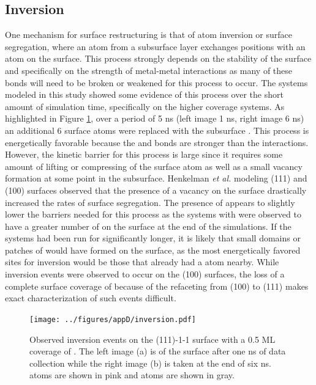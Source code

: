 \subsection{Inversion}
One mechanism for surface restructuring is that of atom inversion or surface
segregation, where an atom from a subsurface layer exchanges positions with an
atom on the surface.  This process strongly depends on the stability of the
surface and specifically on  the strength of metal-metal interactions as many
of these bonds will need to be broken or weakened for this process to occur.
The  systems modeled in this study showed some evidence of this
process over the short amount of simulation time, specifically on the higher
 coverage systems. As highlighted in Figure \ref{fig:inversion}, over a
period of 5 ns (left image 1 ns, right image 6 ns) an additional 6 
surface atoms were replaced with the subsurface .  This process is
energetically favorable because the  and 
bonds are stronger than the  interactions.  However, the
kinetic barrier for this process is large since it requires some amount of
lifting or compressing of the surface atom as well as a small vacancy formation
at some point in the subsurface. Henkelman {\em et al.} modeling (111) and
(100)  surfaces observed that the presence of a vacancy on the surface
drastically increased the rates of surface segregation.\citep{Kim:2013mi} The
presence of  appears to slightly lower the barriers needed for this
process as the systems with  were observed to have a greater number of
 on the surface at the end of the simulations. If the systems had been
run for significantly longer, it is likely that small domains or patches of
 would have formed on the surface, as the most energetically favored
sites for inversion would be those that already had a  atom nearby.
While inversion events were observed to occur on the (100) surfaces, the loss
of a complete surface coverage of  because of the refaceting from (100)
to (111) makes exact characterization of such events difficult.


\begin{figure}[p!]
\centering
\texttt{[image: ../figures/appD/inversion.pdf]}
\caption{Observed inversion events on the (111)-1-1 surface with a
0.5 ML coverage of . The left image (a) is of the surface after one ns
of data collection while the right image (b) is taken at the end of six ns.
 atoms are shown in pink and  atoms are shown in gray.}
\label{fig:inversion}
\end{figure}

